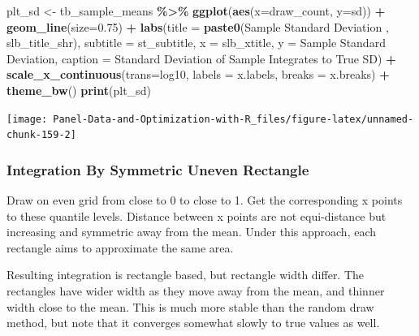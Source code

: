 \documentclass[
]{book}
\newenvironment{Shaded}{\begin{snugshade}}{\end{snugshade}}
\newcommand{\DataTypeTok}[1]{\textcolor[rgb]{0.13,0.29,0.53}{#1}}
\newcommand{\FloatTok}[1]{\textcolor[rgb]{0.00,0.00,0.81}{#1}}
\newcommand{\KeywordTok}[1]{\textcolor[rgb]{0.13,0.29,0.53}{\textbf{#1}}}
\newcommand{\NormalTok}[1]{#1}
\newcommand{\OperatorTok}[1]{\textcolor[rgb]{0.81,0.36,0.00}{\textbf{#1}}}
\newcommand{\StringTok}[1]{\textcolor[rgb]{0.31,0.60,0.02}{#1}}
\begin{document}
\begin{Shaded}
\begin{Highlighting}[]
\NormalTok{plt\_sd \textless{}{-}}\StringTok{ }\NormalTok{tb\_sample\_means }\OperatorTok{\%\textgreater{}\%}
\StringTok{  }\KeywordTok{ggplot}\NormalTok{(}\KeywordTok{aes}\NormalTok{(}\DataTypeTok{x=}\NormalTok{draw\_count, }\DataTypeTok{y=}\NormalTok{sd)) }\OperatorTok{+}
\StringTok{  }\KeywordTok{geom\_line}\NormalTok{(}\DataTypeTok{size=}\FloatTok{0.75}\NormalTok{) }\OperatorTok{+}
\StringTok{  }\KeywordTok{labs}\NormalTok{(}\DataTypeTok{title =} \KeywordTok{paste0}\NormalTok{(}\StringTok{\textquotesingle{}Sample Standard Deviation \textquotesingle{}}\NormalTok{, slb\_title\_shr),}
       \DataTypeTok{subtitle =}\NormalTok{ st\_subtitle,}
       \DataTypeTok{x =}\NormalTok{ slb\_xtitle,}
       \DataTypeTok{y =} \StringTok{\textquotesingle{}Sample Standard Deviation\textquotesingle{}}\NormalTok{,}
       \DataTypeTok{caption =} \StringTok{\textquotesingle{}Standard Deviation of Sample Integrates to True SD\textquotesingle{}}\NormalTok{) }\OperatorTok{+}
\StringTok{  }\KeywordTok{scale\_x\_continuous}\NormalTok{(}\DataTypeTok{trans=}\StringTok{\textquotesingle{}log10\textquotesingle{}}\NormalTok{, }\DataTypeTok{labels =}\NormalTok{ x.labels, }\DataTypeTok{breaks =}\NormalTok{ x.breaks) }\OperatorTok{+}
\StringTok{  }\KeywordTok{theme\_bw}\NormalTok{()}
\KeywordTok{print}\NormalTok{(plt\_sd)}
\end{Highlighting}
\end{Shaded}

\begin{center}\texttt{[image: Panel-Data-and-Optimization-with-R\_files/figure-latex/unnamed-chunk-159-2]} \end{center}

\hypertarget{integration-by-symmetric-uneven-rectangle}{%
\subsubsection{Integration By Symmetric Uneven Rectangle}\label{integration-by-symmetric-uneven-rectangle}}

Draw on even grid from close to 0 to close to 1. Get the corresponding x points to these quantile levels. Distance between x points are not equi-distance but increasing and symmetric away from the mean. Under this approach, each rectangle aims to approximate the same area.

Resulting integration is rectangle based, but rectangle width differ. The rectangles have wider width as they move away from the mean, and thinner width close to the mean. This is much more stable than the random draw method, but note that it converges somewhat slowly to true values as well.
\end{document}

